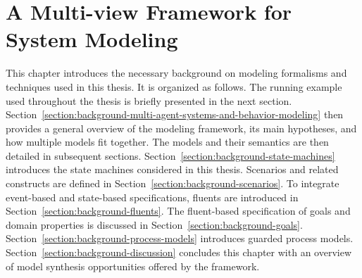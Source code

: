 \chapter{A Multi-view Framework for System Modeling\label{chapter:framework}}

This chapter introduces the necessary background on modeling formalisms and techniques used in this thesis. It is organized as follows. The running example used throughout the thesis is briefly presented in the next section. Section~\ref{section:background-multi-agent-systems-and-behavior-modeling} then provides a general overview of the modeling framework, its main hypotheses, and how multiple models fit together. The models and their semantics are then detailed in subsequent sections. Section~\ref{section:background-state-machines} introduces the state machines considered in this thesis. Scenarios and related constructs are defined in Section~\ref{section:background-scenarios}. To integrate event-based and state-based specifications, fluents are introduced in Section~\ref{section:background-fluents}. The fluent-based specification of goals and domain properties is discussed in Section~\ref{section:background-goals}. Section~\ref{section:background-process-models} introduces guarded process models. Section~\ref{section:background-discussion} concludes this chapter with an overview of model synthesis opportunities offered by the framework.










